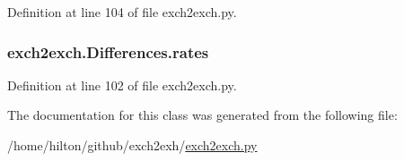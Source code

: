 Definition at line 104 of file exch2exch.\-py.

\hypertarget{classexch2exch_1_1_differences_a64aec2fc7f20028f0bd834908cbea116}{
\subsubsection[{rates}]{\setlength{\rightskip}{0pt plus 5cm}exch2exch.\-Differences.\-rates}}\label{classexch2exch_1_1_differences_a64aec2fc7f20028f0bd834908cbea116}


Definition at line 102 of file exch2exch.\-py.



The documentation for this class was generated from the following file\-:\begin{DoxyCompactItemize}
\item 
/home/hilton/github/exch2exh/\hyperlink{exch2exch_8py}{exch2exch.\-py}\end{DoxyCompactItemize}
